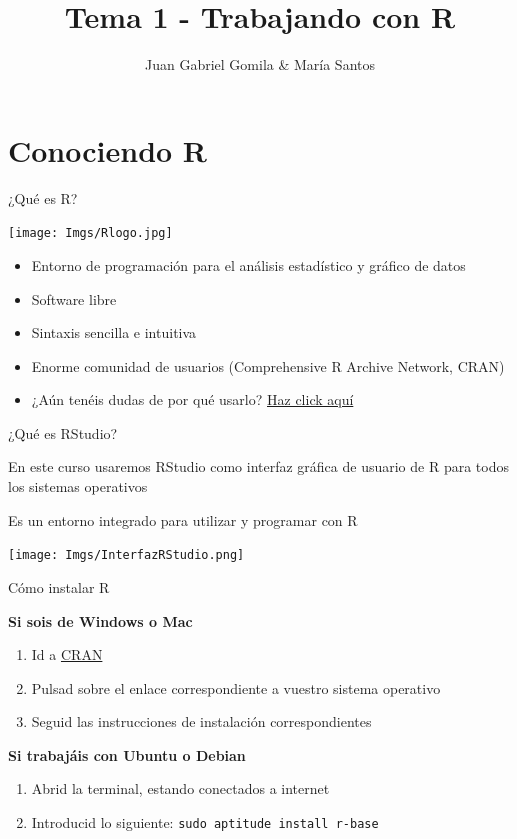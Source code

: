 \documentclass[
  ignorenonframetext,
]{beamer}
\title{Tema 1 - Trabajando con R}
\author{Juan Gabriel Gomila \& María Santos}
\date{}
\providecommand{\tightlist}{%
  \setlength{\itemsep}{0pt}\setlength{\parskip}{0pt}}
\begin{document}
\frame{\titlepage}

\hypertarget{conociendo-r}{%
\section{Conociendo R}\label{conociendo-r}}

\begin{frame}{¿Qué es R?}
\protect\hypertarget{quuxe9-es-r}{}

\texttt{[image: Imgs/Rlogo.jpg]}

\begin{itemize}
\tightlist
\item
  Entorno de programación para el análisis estadístico y gráfico de
  datos
\item
  Software libre
\item
  Sintaxis sencilla e intuitiva
\item
  Enorme comunidad de usuarios (Comprehensive R Archive Network, CRAN)
\item
  ¿Aún tenéis dudas de por qué usarlo?
  \href{https://www.r-bloggers.com/why-use-r-five-reasons/}{Haz click
  aquí}
\end{itemize}

\end{frame}

\begin{frame}{¿Qué es RStudio?}
\protect\hypertarget{quuxe9-es-rstudio}{}

En este curso usaremos RStudio como interfaz gráfica de usuario de R
para todos los sistemas operativos

Es un entorno integrado para utilizar y programar con R

\texttt{[image: Imgs/InterfazRStudio.png]}

\end{frame}

\begin{frame}[fragile]{Cómo instalar R}
\protect\hypertarget{cuxf3mo-instalar-r}{}

\textbf{Si sois de Windows o Mac}

\begin{enumerate}
\tightlist
\item
  Id a \href{http://cran.r-project.org/}{CRAN}
\item
  Pulsad sobre el enlace correspondiente a vuestro sistema operativo
\item
  Seguid las instrucciones de instalación correspondientes
\end{enumerate}

\textbf{Si trabajáis con Ubuntu o Debian}

\begin{enumerate}
\tightlist
\item
  Abrid la terminal, estando conectados a internet
\item
  Introducid lo siguiente: \texttt{sudo\ aptitude\ install\ r-base}
\end{enumerate}

\end{frame}
\end{document}
